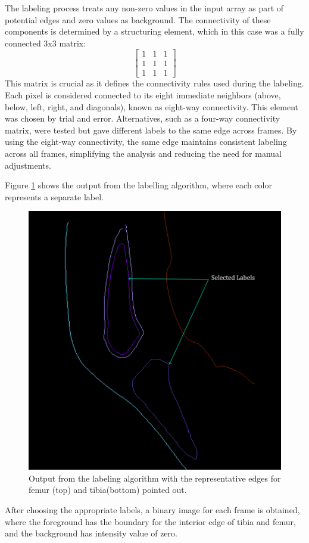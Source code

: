 \documentclass{micro-econ-thesis}
\begin{document}
The labeling process treats any non-zero values in the input array as part of potential edges and zero values as background. The connectivity of these components is determined by a structuring element, which in this case was a fully connected 3x3 matrix:
$$
\begin{bmatrix}
	1 & 1 & 1 \\
	1 & 1 & 1 \\
	1 & 1 & 1
\end{bmatrix}
$$
This matrix is crucial as it defines the connectivity rules used during the labeling. Each pixel is considered connected to its eight immediate neighbors (above, below, left, right, and diagonals), known as eight-way connectivity. This element was chosen by trial and error. Alternatives, such as a four-way connectivity matrix, were tested but gave different labels to the same edge across frames. By using the eight-way connectivity, the same edge maintains consistent labeling across all frames, simplifying the analysis and reducing the need for manual adjustments. 

Figure \ref{fig:labelimg} shows the output from the labelling algorithm, where each color represents a separate label. 

\begin{figure}[H]
	\centering
	\includegraphics[width=0.7\linewidth]{label_selected}
	\caption{Output from the labeling algorithm with the representative edges for femur (top) and tibia(bottom) pointed out.}
	\label{fig:labelimg}
\end{figure}
 
After choosing the appropriate labels, a binary image for each frame is obtained, where the foreground has the boundary for the interior edge of tibia and femur, and the background has intensity value of zero.   
\end{document}
